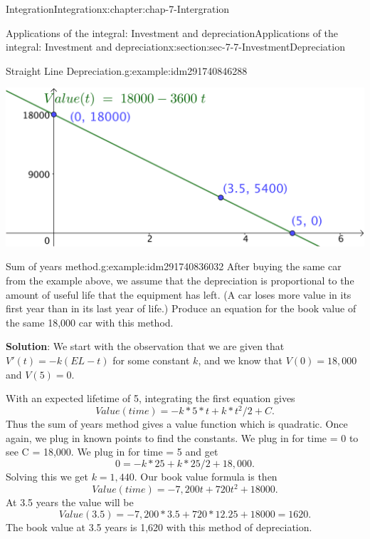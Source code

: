 \documentclass[oneside,10pt,]{book}
\newcommand{\terminology}[1]{\textbf{#1}}
\numberwithin{equation}{section}
\begin{document}
\begin{chapterptx}{Integration}{}{Integration}{}{}{x:chapter:chap-7-Intergration}
\begin{sectionptx}{Applications of the integral: Investment and depreciation}{}{Applications of the integral: Investment and depreciation}{}{}{x:section:sec-7-7-InvestmentDepreciation}
\begin{example}{Straight Line Depreciation.}{g:example:idm291740846288}
\begin{sidebyside}{1}{0.2}{0.2}{0}
\begin{sbspanel}{0.6}
\includegraphics[width=\linewidth]{images/sec7-7-6.png}
\end{sbspanel}%
\end{sidebyside}%
\end{example}
\begin{example}{Sum of years method.}{g:example:idm291740836032}%
After buying the same car from the example above, we assume that the depreciation is proportional to the amount of useful life that the equipment has left.  (A car loses more value in its first year than in its last year of life.)   Produce an equation for the book value of the same \textdollar{}18,000 car with this method.%
\par
\terminology{Solution}: We start with the observation that we are given that \(V' (t)=-k(EL-t)\) for some constant \(k\), and we know that \(V(0)=18,000\) and \(V(5)=0\).%
\par
With an expected lifetime of 5, integrating the first equation gives%
%
\begin{equation*}
Value(time)=-k*5*t+k*t^2/2+C.
\end{equation*}
Thus the sum of years method gives a value function which is quadratic.  Once again, we plug in known points to find the constants.  We plug in for time = 0 to see C = 18,000.  We plug in for time = 5 and get%
%
\begin{equation*}
0=-k*25+k*25/2+18,000.
\end{equation*}
Solving this we get \(k = 1,440\).  Our book value formula is then%
%
\begin{equation*}
Value(time)=-7,200 t+720 t^2+18000.
\end{equation*}
At 3.5 years the value will be%
%
\begin{equation*}
Value(3.5)=-7,200*3.5+720*12.25+18000=1620.
\end{equation*}
The book value at 3.5 years is \textdollar{}1,620 with this method of depreciation.%
\begin{sidebyside}{1}{0.25}{0.25}{0}%

\end{sidebyside}
\end{example}
\end{sectionptx}
\end{chapterptx}
\end{document}
